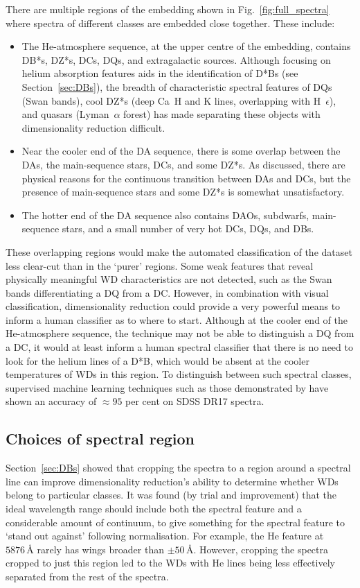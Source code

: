 \documentclass[fleqn,usenatbib]{mnras}
\begin{document}
There are multiple regions of the embedding shown in Fig.~\ref{fig:full_spectra} where spectra of different classes are embedded close together.
These include:
\begin{itemize}
\item
The He-atmosphere sequence, at the upper centre of the embedding, contains DB*s, DZ*s, DCs, DQs, and extragalactic sources.
Although focusing on helium absorption features aids in the identification of D*Bs (see Section~\ref{sec:DBs}), the breadth of characteristic spectral features of DQs (Swan bands), cool DZ*s (deep Ca~H and K lines, overlapping with H~$\epsilon$), and quasars (Lyman~$\alpha$ forest) has made separating these objects with dimensionality reduction difficult.
\item
Near the cooler end of the DA sequence, there is some overlap between the DAs, the main-sequence stars, DCs, and some DZ*s.
As discussed, there are physical reasons for the continuous transition between DAs and DCs, but the presence of main-sequence stars and some DZ*s is somewhat unsatisfactory.
\item
The hotter end of the DA sequence also contains DAOs, subdwarfs, main-sequence stars, and a small number of very hot DCs, DQs, and DBs.
\end{itemize}
These overlapping regions would make the automated classification of the dataset less clear-cut than in the `purer' regions.
Some weak features that reveal physically meaningful WD characteristics are not detected, such as the Swan bands differentiating a DQ from a DC.
However, in combination with visual classification, dimensionality reduction could provide a very powerful means to inform a human classifier as to where to start.
Although at the cooler end of the He-atmosphere sequence, the technique may not be able to distinguish a DQ from a DC, it would at least inform a human spectral classifier that there is no need to look for the helium lines of a D*B, which would be absent at the cooler temperatures of WDs in this region.
To distinguish between such spectral classes, supervised machine learning techniques such as those demonstrated by \citet{vincent23} have shown an accuracy of $\approx 95$ per cent on SDSS DR17 spectra.

\subsection{Choices of spectral region}

Section~\ref{sec:DBs} showed that cropping the spectra to a region around a spectral line can improve dimensionality reduction's ability to determine whether WDs belong to particular classes.
It was found (by trial and improvement) that the ideal wavelength range should include both the spectral feature and a considerable amount of continuum, to give something for the spectral feature to `stand out against' following normalisation.
For example, the He feature at $5876\,\text{\AA}$ rarely has wings broader than $\pm50\,\text{\AA}$.
However, cropping the spectra cropped to just this region led to the WDs with He lines being less effectively separated from the rest of the spectra.
\end{document}

